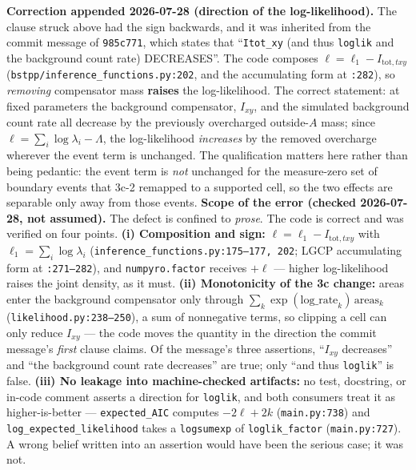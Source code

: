 \documentclass[
  10pt,
]{article}
\begin{document}
\textbf{Correction appended 2026-07-28 (direction of the log-likelihood).} The clause struck above had the sign backwards, and it was inherited from the commit message of \texttt{985c771}, which states that ``\texttt{Itot\_xy} (and thus \texttt{loglik} and the background count rate) DECREASES''. The code composes \(\ell = \ell_1 - I_{\mathrm{tot},txy}\) (\texttt{bstpp/\allowbreak{}inference\_\allowbreak{}functions.py:202}, and the accumulating form at \texttt{:282}), so \emph{removing} compensator mass \textbf{raises} the log-likelihood. The correct statement: at fixed parameters the background compensator, \(I_{xy}\), and the simulated background count rate all decrease by the previously overcharged outside-\(A\) mass; since \(\ell = \sum_i \log \lambda_i - \Lambda\), the log-likelihood \emph{increases} by the removed overcharge wherever the event term is unchanged. The qualification matters here rather than being pedantic: the event term is \emph{not} unchanged for the measure-zero set of boundary events that 3c-2 remapped to a supported cell, so the two effects are separable only away from those events. \textbf{Scope of the error (checked 2026-07-28, not assumed).} The defect is confined to \emph{prose}. The code is correct and was verified on four points. \textbf{(i) Composition and sign:} \(\ell = \ell_1 - I_{\mathrm{tot},txy}\) with \(\ell_1 = \sum_i \log \lambda_i\) (\texttt{inference\_\allowbreak{}functions.py:175--177, 202}; LGCP accumulating form at \texttt{:271--282}), and \texttt{numpyro.factor} receives \(+\ell\) --- higher log-likelihood raises the joint density, as it must. \textbf{(ii) Monotonicity of the 3c change:} areas enter the background compensator only through \(\sum_k \exp(\text{log\_rate}_k)\,\mathrm{areas}_k\) (\texttt{likelihood.py:238--250}), a sum of nonnegative terms, so clipping a cell can only reduce \(I_{xy}\) --- the code moves the quantity in the direction the commit message's \emph{first} clause claims. Of the message's three assertions, ``\(I_{xy}\) decreases'' and ``the background count rate decreases'' are true; only ``and thus \texttt{loglik}'' is false. \textbf{(iii) No leakage into machine-checked artifacts:} no test, docstring, or in-code comment asserts a direction for \texttt{loglik}, and both consumers treat it as higher-is-better --- \texttt{expected\_AIC} computes \(-2\ell + 2k\) (\texttt{main.py:738}) and \texttt{log\_expected\_likelihood} takes a \texttt{logsumexp} of \texttt{loglik\_factor} (\texttt{main.py:727}). A wrong belief written into an assertion would have been the serious case; it was not.
\end{document}
